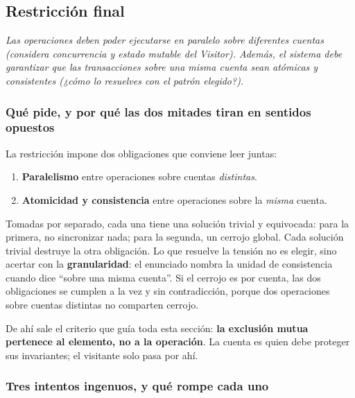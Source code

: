 {}
\subsection*{Restricción final}

\sloppy

\textit{Las operaciones deben poder ejecutarse en paralelo sobre diferentes cuentas (considera
concurrencia y estado mutable del Visitor). Además, el sistema debe garantizar que las
transacciones sobre una misma cuenta sean atómicas y consistentes (¿cómo lo resuelves con el
patrón elegido?).}

\vspace{0.4cm}

\subsubsection*{Qué pide, y por qué las dos mitades tiran en sentidos opuestos}

La restricción impone dos obligaciones que conviene leer juntas:

\begin{enumerate}[leftmargin=1.2cm]
    \item \textbf{Paralelismo} entre operaciones sobre cuentas \emph{distintas}.
    \item \textbf{Atomicidad y consistencia} entre operaciones sobre la \emph{misma} cuenta.
\end{enumerate}

Tomadas por separado, cada una tiene una solución trivial y equivocada: para la primera, no
sincronizar nada; para la segunda, un cerrojo global. Cada solución trivial destruye la otra
obligación. Lo que resuelve la tensión no es elegir, sino acertar con la
\textbf{granularidad}: el enunciado nombra la unidad de consistencia cuando dice ``sobre una
misma cuenta''. Si el cerrojo es por cuenta, las dos obligaciones se cumplen a la vez y sin
contradicción, porque dos operaciones sobre cuentas distintas no comparten cerrojo.

De ahí sale el criterio que guía toda esta sección: \textbf{la exclusión mutua pertenece al
elemento, no a la operación}. La cuenta es quien debe proteger sus invariantes; el visitante
solo pasa por ahí.

\subsubsection*{Tres intentos ingenuos, y qué rompe cada uno}

